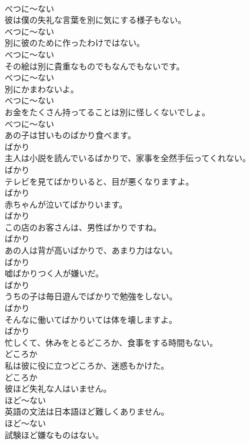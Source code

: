 \documentclass[8pt]{extreport}
\begin{document}
\begin{CJK}{UTF8}{min}
\\	べつに～ない	
\\	彼は僕の失礼な言葉を別に気にする様子もない。	
\\	べつに～ない	
\\	別に彼のために作ったわけではない。	
\\	べつに～ない	
\\	その絵は別に貴重なものでもなんでもないです。	
\\	べつに～ない	
\\	別にかまわないよ。	
\\	べつに～ない	
\\	お金をたくさん持ってることは別に怪しくないでしょ。	
\\	べつに～ない	
\\	あの子は甘いものばかり食べます。	
\\	ばかり	
\\	主人は小説を読んでいるばかりで、家事を全然手伝ってくれない。	
\\	ばかり	
\\	テレビを見てばかりいると、目が悪くなりますよ。	
\\	ばかり	
\\	赤ちゃんが泣いてばかりいます。	
\\	ばかり	
\\	この店のお客さんは、男性ばかりですね。	
\\	ばかり	
\\	あの人は背が高いばかりで、あまり力はない。	
\\	ばかり	
\\	嘘ばかりつく人が嫌いだ。	
\\	ばかり	
\\	うちの子は毎日遊んでばかりで勉強をしない。	
\\	ばかり	
\\	そんなに働いてばかりいては体を壊しますよ。	
\\	ばかり	
\\	忙しくて、休みをとるどころか、食事をする時間もない。	
\\	どころか	
\\	私は彼に役に立つどころか、迷惑もかけた。	
\\	どころか	
\\	彼ほど失礼な人はいません。	
\\	ほど～ない	
\\	英語の文法は日本語ほど難しくありません。	
\\	ほど～ない	
\\	試験ほど嫌なものはない。	

\end{CJK}
\end{document}

